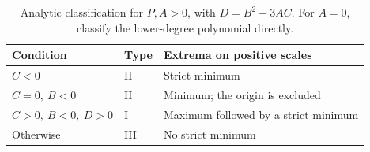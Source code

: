 \begin{table}[htbp]
\centering
\small
\caption{Analytic classification for $P,A>0$, with $D=B^2-3AC$. For $A=0$, classify the lower-degree polynomial directly.}\label{tab:v3:3}
\setlength{\tabcolsep}{4pt}
\renewcommand{\arraystretch}{1.25}
\begin{tabularx}{\linewidth}{llX}
\toprule
Condition & Type & Extrema on positive scales \\
\midrule
$C<0$ & II & Strict minimum \\
$C=0,\ B<0$ & II & Minimum; the origin is excluded \\
$C>0,\ B<0,\ D>0$ & I & Maximum followed by a strict minimum \\
Otherwise & III & No strict minimum \\
\bottomrule
\end{tabularx}
\end{table}
